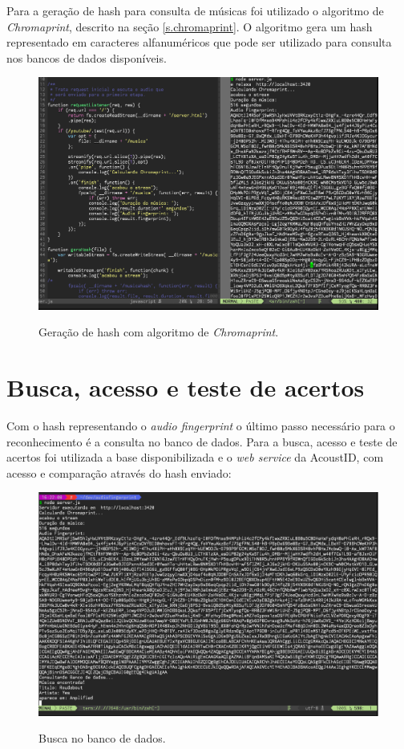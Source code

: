 Para a geração de hash para consulta de músicas foi utilizado o algoritmo de \emph{Chromaprint}, descrito na seção \ref{s.chromaprint}. O algoritmo gera um hash representado em caracteres alfanuméricos que pode ser utilizado para consulta nos bancos de dados disponíveis. 

\begin{figure}[h]
\caption{\small Geração de hash com algoritmo de \emph{Chromaprint}.}
\centering
\includegraphics[scale=0.60]{figs/hashchromaprint.png}
\label{f.musicbrainz}
\end{figure}
 

\section{Busca, acesso e teste de acertos}
\label{s.buscanobd}

Com o hash representando o \emph{audio fingerprint} o último passo necessário para o reconhecimento é a consulta no banco de dados. Para a busca, acesso e teste de acertos foi utilizada a base disponibilizada \cite{musicbrainzcite} e o  \emph{web service} da AcoustID, com acesso e comparação através do hash enviado:

\begin{figure}[h]
\caption{\small Busca no banco de dados.}
\centering
\includegraphics[scale=0.60]{figs/yes.png}
\label{f.musicbrainz}
\end{figure}
 